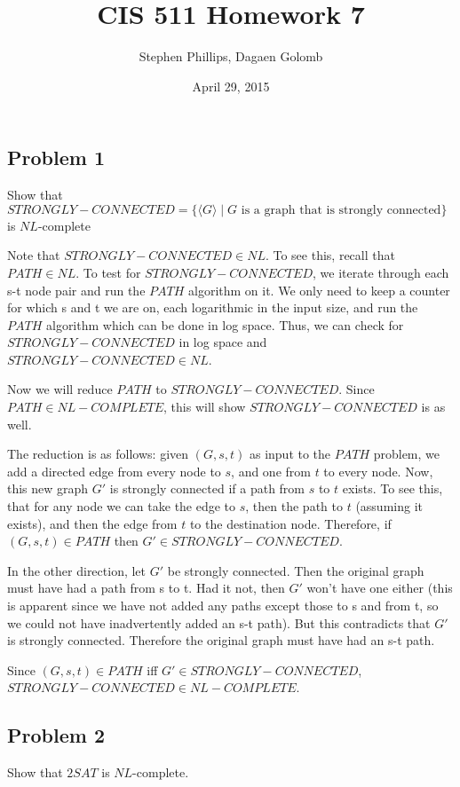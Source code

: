 \documentclass[english]{article}
\title{CIS 511 Homework 7}
\author{Stephen Phillips, Dagaen Golomb}
\date{April 29, 2015}
\begin{document}
\maketitle
\subsection*{Problem 1}
Show that $STRONGLY-CONNECTED = \{ \langle G \rangle \mid G \textrm{ is a graph that is strongly connected} \}$
is $NL$-complete

Note that $STRONGLY-CONNECTED \in NL$. To see this, recall that $PATH \in NL$. To test for  $STRONGLY-CONNECTED$, we iterate through each s-t node pair and run the $PATH$ algorithm on it. We only need to keep a counter for which s and t we are on, each logarithmic in the input size, and run the $PATH$ algorithm which can be done in log space. Thus, we can check for $STRONGLY-CONNECTED$ in log space and $STRONGLY-CONNECTED \in NL$.

Now we will reduce $PATH$ to $STRONGLY-CONNECTED$. Since $PATH \in NL-COMPLETE$, this will show $STRONGLY-CONNECTED$ is as well.

The reduction is as follows: given $(G,s,t)$ as input to the $PATH$ problem, we add a directed edge from every node to $s$, and one from $t$ to every node. Now, this new graph $G'$ is strongly connected if a path from $s$ to $t$ exists. To see this, that for any node we can take the edge to $s$, then the path to $t$ (assuming it exists), and then the edge from $t$ to the destination node. Therefore, if $(G,s,t) \in PATH$ then $G' \in STRONGLY-CONNECTED$.

In the other direction, let $G'$ be strongly connected. Then the original graph must have had a path from s to t. Had it not, then $G'$ won't have one either (this is apparent since we have not added any paths except those to s and from t, so we could not have inadvertently added an s-t path). But this contradicts that $G'$ is strongly connected. Therefore the original graph must have had an s-t path.

Since $(G,s,t) \in PATH$ iff $G' \in STRONGLY-CONNECTED$, $STRONGLY-CONNECTED \in NL-COMPLETE$.

\subsection*{Problem 2}
Show that $2SAT$ is $NL$-complete.
\end{document}
